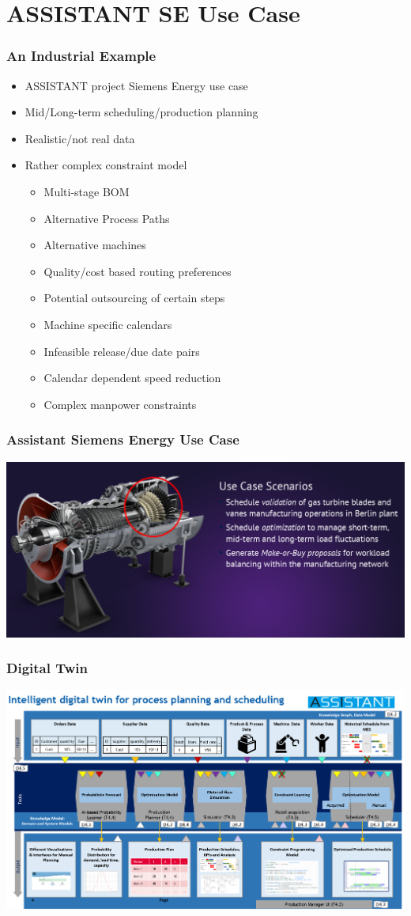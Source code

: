 \section{ASSISTANT SE Use Case}

\begin{frame}
\frametitle{An Industrial Example}
\begin{itemize}
\item ASSISTANT project Siemens Energy use case
\item Mid/Long-term scheduling/production planning
\item Realistic/not real data
\item Rather complex constraint model
\begin{itemize}
\item Multi-stage BOM
\item Alternative Process Paths
\item Alternative machines
\item Quality/cost based routing preferences
\item Potential outsourcing of certain steps
\item Machine specific calendars
\item Infeasible release/due date pairs
\item Calendar dependent speed reduction
\item Complex manpower constraints  
\end{itemize}
\end{itemize}
\end{frame}


\begin{frame}
\frametitle{Assistant Siemens Energy Use Case}
\includegraphics[width=\textwidth]{imagesse/assistantgasturbine}
\end{frame}

\begin{frame}
\frametitle{Digital Twin}
\includegraphics[width=.9\textwidth]{imagesse/assistantdigitaltwin}
\end{frame}

